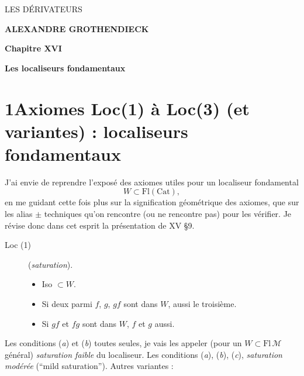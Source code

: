 \documentclass[11pt]{article}
\newcommand{\printedpage}[1]{\marginpar{\footnotesize p.~#1}}
\newcommand{\msp}[1]{\marginpar{\footnotesize [#1]}}
\newcommand{\Cat}{\mathrm{Cat}}
\begin{document}
\printedpage{[non numérotée]}

\begin{center}
{\sffamily\LARGE LES DÉRIVATEURS}

\bigskip

{\large\textbf{ALEXANDRE GROTHENDIECK}}

\vspace{3em}

{\large\textbf{Chapitre XVI}}

\medskip

{\large\textbf{Les localiseurs fondamentaux}}
\end{center}

\clearpage


\printedpage{1}

\msp{page 1}

\section*{1\quad Axiomes Loc(1) à Loc(3) (et variantes) : localiseurs fondamentaux}

J’ai envie de reprendre l’exposé des axiomes utiles pour un localiseur fondamental
\[
W \subset \mathrm{Fl}(\Cat),
\]
en me guidant cette fois plus sur la signification géométrique des axiomes, que sur les alias $\pm$ techniques qu’on rencontre (ou ne rencontre pas) pour les vérifier. Je révise donc dans cet esprit la présentation de XV §9.

\begin{description}
\item[Loc (1)] (\textit{saturation}).
\begin{itemize}
\item[\textit{a})] Iso $\subset W$.
\item[\textit{b})] Si deux parmi $f$, $g$, $gf$ sont dans $W$, aussi le troisième.
\item[\textit{c})] Si $gf$ et $fg$ sont dans $W$, $f$ et $g$ aussi.
\end{itemize}
\end{description}

Les conditions (\textit{a}) et (\textit{b}) toutes seules, je vais les appeler (pour un $W \subset \mathrm{Fl}\,\mathcal{M}$ général) \textit{saturation faible} du localiseur. Les conditions (\textit{a}), (\textit{b}), (\textit{c}), \textit{saturation modérée} (“mild saturation”). Autres variantes :
\end{document}
